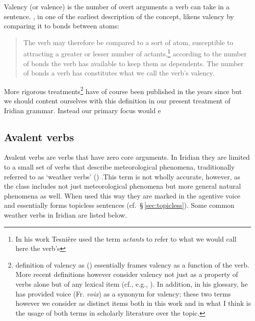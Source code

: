 Valency (or valence) is the number of overt arguments a verb can take in a sentence. \textcite[239]{tesniere1965}, in one of the earliest description of the concept, likens valency by comparing it to bonds between atoms:
\begin{quotation}
	\small
The verb may therefore be compared to a sort of atom, susceptible to attracting a greater or lesser number of actants,\footnote{In his work Tesni\`ere used the term \emph{actants} to refer to what we would call here the verb's } according to the number of bonds the verb has available to keep them as dependents. The number of bonds a verb has constitutes what we call the verb's valency.
\end{quotation}

More rigorous treatments\footnote{ definition of valency as  () essentially frames valency as a function of the verb. More recent definitions however consider valency not just as a property of verbs alone but of any lexical item (cf., e.g., \cite{matthews1997,trask1993}). In addition, in his glossary, he has provided voice (Fr. \emph{voix}) as a synonym for valency; these two terms however we consider as distinct items both in this work and in what I think is the usage of both terms in scholarly literature over the topic.} have of course been published in the years since but we should content ourselves with this definition in our present treatment of Iridian grammar. Instead our primary focus would e

\subsection{Avalent verbs}

Avalent verbs  are verbs that have zero core arguments. In Iridian they are limited to a small set of verbs that describe meteorological phenomena, traditionally referred to as `weather verbs' () .This term is not wholly accurate, however, as the class includes not just meteorological phenomena but more general natural phenomena as well. When used this way they are marked in the agentive voice and essentially forms topicless sentences (cf.~\S\,\ref{sec:topicless}). Some common weather verbs in Iridian are listed below.

